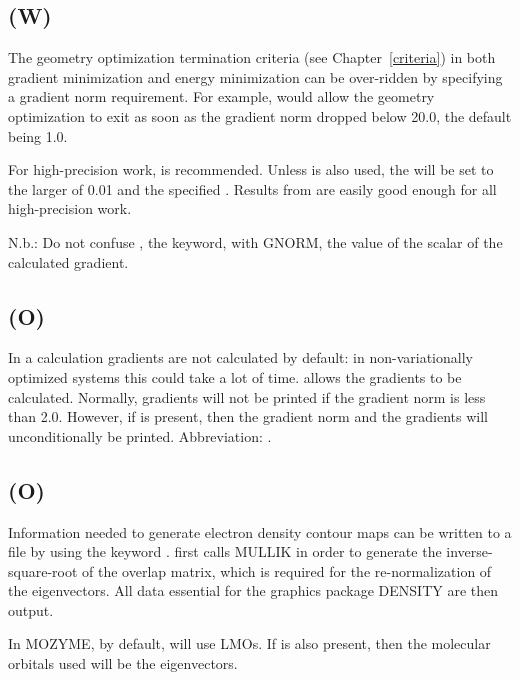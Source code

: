\subsection*{ (W)}
The geometry optimization  termination  criteria (see Chapter~\ref{criteria})  in  both  gradient
minimization  and  energy minimization can be over-ridden by specifying a
gradient  norm  requirement.   For  example,    would  allow  the
geometry  optimization to exit as soon as the gradient norm dropped below
20.0, the default being 1.0.

For high-precision work,  is recommended.   Unless
  is
also  used, the  will be set to the larger of 0.01 and the specified
. Results  from    are  easily  good  enough   for   all
high-precision work.

N.b.: Do not confuse , the keyword, with GNORM, the value of the scalar
of the calculated gradient.

\subsection*{ (O)}
In a  calculation gradients are not calculated by  default:   in
non-variationally  optimized  systems  this could take a lot of time.
 allows the gradients to  be  calculated.   Normally,  gradients
will  not  be printed if the gradient norm is less than 2.0.  However, if
 is present, then the  gradient  norm  and  the  gradients  will
unconditionally be printed.  Abbreviation:  .



\subsection*{ (O)}
Information needed to generate electron density contour maps can  be
written to a file by using the keyword .  first
calls MULLIK in order to
generate the inverse-square-root of the overlap matrix, which is required
for the re-normalization of the eigenvectors.  All data essential for the
graphics package DENSITY are then output.

In MOZYME, by default,  will use LMOs.  If  is
also present, then the molecular orbitals used will be the eigenvectors.

